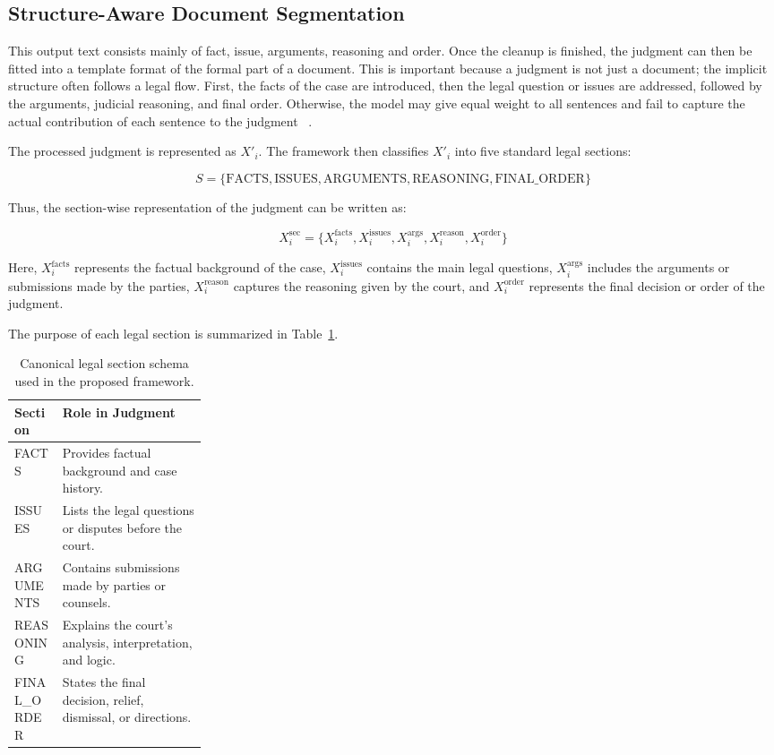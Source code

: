 \documentclass[11pt, a4paper]{article}
\theoremstyle{plain}%
\theoremstyle{remark}%
\theoremstyle{definition}%
\begin{document}
\subsection{Structure-Aware Document Segmentation}

This output text consists mainly of fact, issue, arguments, reasoning and order. Once the cleanup is finished, the judgment can then be fitted into a template format of the formal part of a document. This is important because a judgment is not just a document; the implicit structure often follows a legal flow. First, the facts of the case are introduced, then the legal question or issues are addressed, followed by the arguments, judicial reasoning, and final order. Otherwise, the model may give equal weight to all sentences and fail to capture the actual contribution of each sentence to the judgment ~\cite{b3}.

The processed judgment is represented as \(X'_i\). 
The framework then classifies \(X'_i\) into five standard legal sections:

\begin{equation}
S = \{\text{FACTS}, \text{ISSUES}, \text{ARGUMENTS}, \text{REASONING}, \text{FINAL\_ORDER}\}
\end{equation}

Thus, the section-wise representation of the judgment can be written as:

\begin{equation}
X_i^{\text{sec}} =
\{X_i^{\text{facts}}, X_i^{\text{issues}}, X_i^{\text{args}}, X_i^{\text{reason}}, X_i^{\text{order}}\}
\end{equation}

Here, \(X_i^{\text{facts}}\) represents the factual background of the case, 
\(X_i^{\text{issues}}\) contains the main legal questions, \(X_i^{\text{args}}\) includes the 
arguments or submissions made by the parties, \(X_i^{\text{reason}}\) captures the 
reasoning given by the court, and \(X_i^{\text{order}}\) represents the final decision or order of the judgment.

The purpose of each legal section is summarized in Table~\ref{tab:section_schema}.

\begin{table}[H]
\centering
\caption{Canonical legal section schema used in the proposed framework.}
\label{tab:section_schema}
\renewcommand{\arraystretch}{1.25}
\begin{tabularx}{\linewidth}{@{}p{0.25\linewidth}X@{}}
\toprule
\textbf{Section} & \textbf{Role in Judgment} \\
\midrule
FACTS & Provides factual background and case history. \\
ISSUES & Lists the legal questions or disputes before the court. \\
ARGUMENTS & Contains submissions made by parties or counsels. \\
REASONING & Explains the court's analysis, interpretation, and logic. \\
FINAL\_ORDER & States the final decision, relief, dismissal, or directions. \\
\bottomrule
\end{tabularx}
\end{table}
\end{document}
